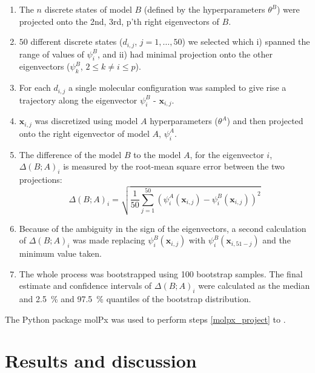 \documentclass[journal=jacsat,manuscript=article]{achemso}
\begin{document}
\begin{enumerate}
    \item The $n$ discrete states of model $B$  (defined by the hyperparameters $\theta^{B}$) were projected onto the 2nd, 3rd, p'th right eigenvectors of $B$.  \label{molpx_project}
    \item $50$ different discrete states ($d_{i,j}$, $j = 1,\ldots, 50$) we selected which i) spanned the range of values of $\psi^{B}_{i}$, and ii) had minimal projection onto the other eigenvectors ($\psi^{B}_{k}$, $2 \le k \ne i \le p$). \label{molpx_sample}
    \item For each $d_{i,j}$ a single molecular configuration was sampled to give rise a trajectory along the eigenvector $\psi^{B}_{i}$ - $\mathbf{x}_{i, j}$.  \label{molpx_configs}
    \item $\mathbf{x}_{i, j}$ was discretized using model $A$ hyperparameters ($\theta^{A}$) and then projected onto the right eigenvector of model $A$, $\psi^{A}_{i}$. 
    \item The difference of the model $B$ to the model $A$, for the eigenvector $i$, $\Delta(B; A)_{i}$ is measured by the root-mean square error between the two projections:
    \begin{equation}
        \Delta(B; A)_{i} = \sqrt{\frac{1}{50}\sum_{j=1}^{50} \left(\psi^{A}_{i}(\mathbf{x}_{i, j})- \psi^{B}_{i}(\mathbf{x}_{i, j})\right )^{2}}
    \end{equation}\label{eqn:overlap}
    \item Because of the ambiguity in the sign of the eigenvectors, a second calculation of  $\Delta(B; A)_{i}$ was made replacing $\psi^{B}_{i}(\mathbf{x}_{i, j})$ with $\psi^{B}_{i}(\mathbf{x}_{i, 51-j})$ and the minimum value taken.  
    \item The whole process was bootstrapped using \num{100} bootstrap samples. The final estimate and confidence intervals of $\Delta(B; A)_{i}$ were calculated as the median and \SI{2.5}{\percent} and \SI{97.5}{\percent} quantiles of the bootstrap distribution.  
\end{enumerate}

The Python package molPx was used to perform steps \ref{molpx_project} to \label{molpx_configs}. 



\section{Results and discussion}
\end{document}

